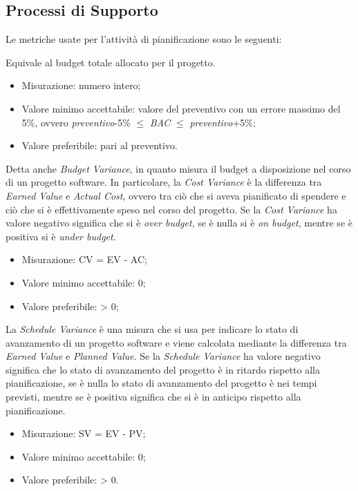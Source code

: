 \subsection{Processi di Supporto}

	Le metriche usate per l'attività di pianificazione sono le seguenti:
	
		Equivale al budget totale allocato per il progetto.
		\begin{itemize}
			\item{Misurazione: numero intero;}
			\item{Valore minimo accettabile: valore del preventivo con un errore massimo del 5\%, ovvero \textit{preventivo}-5\% $\leq$ \textit{BAC} $\leq$ \textit{preventivo}+5\%;}
			\item{Valore preferibile: pari al preventivo.}
		\end{itemize}
	
		Detta anche \textit{Budget Variance}, in quanto misura il budget a disposizione nel corso di un progetto software. In particolare, la \textit{Cost Variance} è la differenza tra \textit{Earned Value} e \textit{Actual Cost}, ovvero tra ciò che si aveva pianificato di spendere e ciò che si è effettivamente speso nel corso del progetto.
		Se la \textit{Cost Variance} ha valore negativo significa che si è \textit{over budget}, se è nulla si è \textit{on budget}, mentre se è positiva si è \textit{under budget}.
		\begin{itemize}
			\item{Misurazione: CV = EV - AC;}
			\item{Valore minimo accettabile: 0;}
			\item{Valore preferibile: > 0;}
		\end{itemize}
		
		La \textit{Schedule Variance} è una misura che si usa per indicare lo stato di avanzamento di un progetto software e viene calcolata mediante la differenza tra \textit{Earned Value} e \textit{Planned Value}. 		Se la \textit{Schedule Variance} ha valore negativo significa che lo stato di avanzamento del progetto è in ritardo rispetto alla pianificazione, se è nulla lo stato di avanzamento del progetto è nei tempi previsti, mentre se è positiva significa che si è in anticipo rispetto alla pianificazione.
		\begin{itemize}
			\item{Misurazione: SV = EV - PV;}
			\item{Valore minimo accettabile: 0;}
			\item{Valore preferibile: > 0.}
		\end{itemize}
		

